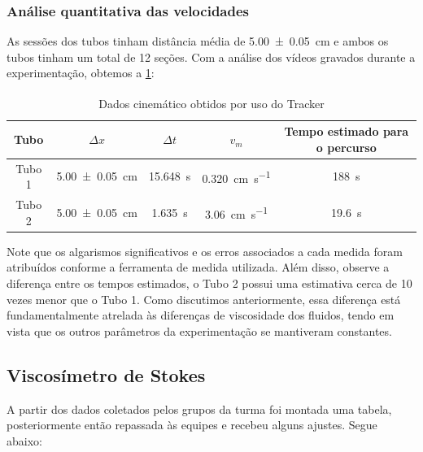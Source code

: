 \subsubsection{Análise quantitativa das velocidades}
    As sessões dos tubos tinham distância média de
    \qty{5.00\pm0.05}{\centi\meter} e ambos os tubos tinham um total de 12
    seções. Com a análise dos vídeos gravados durante a experimentação, obtemos
    a \cref{tab:tubos}:
    \begin{table}[H]
    \caption{Dados cinemático obtidos por uso do
    Tracker\textsuperscript{\textcopyright}}\label{tab:tubos}
    \begin{center}
    \begin{tabular}{c c c c c}
    \hline
    Tubo & \( \Delta x \) & \( \Delta t \) & \( v_m \) & Tempo estimado para o
    percurso \\
    \hline
    Tubo 1 & \qty{5.00\pm0.05}{\centi\meter} & \qty{15.648}{\second} &
    \qty{0.320}{\centi\meter\per\second} & \qty{188}{\second} \\
    Tubo 2 & \qty{5.00\pm0.05}{\centi\meter} & \qty{1.635}{\second} &
    \qty{3.06}{\centi\meter\per\second} & \qty{19.6}{\second} \\
    \hline
    \end{tabular}
    \end{center}
    \end{table}
    Note que os algarismos significativos e os erros associados a cada medida
    foram atribuídos conforme a ferramenta de medida utilizada.  Além disso,
    observe a diferença entre os tempos estimados, o Tubo 2 possui uma
    estimativa cerca de 10 vezes menor que o Tubo 1. Como discutimos
    anteriormente, essa diferença está fundamentalmente atrelada às diferenças
    de viscosidade dos fluidos, tendo em vista que os outros parâmetros da
    experimentação se mantiveram constantes. 

\subsection{Viscosímetro de Stokes}\label{sec:viscStokes}
    A partir dos dados coletados pelos grupos da turma foi montada uma tabela, posteriormente então repassada às equipes e recebeu alguns ajustes. Segue abaixo:

